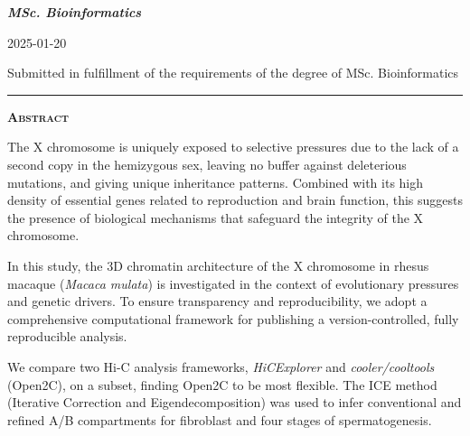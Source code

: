 \documentclass[
  11pt,
  a4paper,
]{scrbook}
\begin{document}
{{\bfseries\Large\textit{MSc. Bioinformatics} \par}
\vspace{3ex}

{\large 2025-01-20 \par}
\vspace{3ex}

\vspace{10ex}
{\small Submitted in fulfillment of the requirements
of the degree of MSc. Bioinformatics \par}
\pagebreak


\vspace*{\fill} %
\noindent
\begin{minipage}{.8\textwidth}
    \centering
    \hspace*{\fill}\rule{0.5\textwidth}{0.4pt}\hspace*{\fill} %
    \par \vspace{2em} %
    {\Large\bfseries\scshape Abstract} %
    \par %
    \vspace{1em} %
    \justifying %
    The X chromosome is uniquely exposed to selective pressures due to
the lack of a second copy in the hemizygous sex, leaving no buffer
against deleterious mutations, and giving unique inheritance patterns.
Combined with its high density of essential genes related to
reproduction and brain function, this suggests the presence of
biological mechanisms that safeguard the integrity of the X chromosome.

In this study, the 3D chromatin architecture of the X chromosome in
rhesus macaque (\emph{Macaca mulata}) is investigated in the context of
evolutionary pressures and genetic drivers. To ensure transparency and
reproducibility, we adopt a comprehensive computational framework for
publishing a version-controlled, fully reproducible analysis.

We compare two Hi-C analysis frameworks, \emph{HiCExplorer} and
\emph{cooler/cooltools} (Open2C), on a subset, finding Open2C to be most
flexible. The ICE method (Iterative Correction and Eigendecomposition)
was used to infer conventional and refined A/B compartments for
fibroblast and four stages of spermatogenesis.


\end{minipage}}
\end{document}
